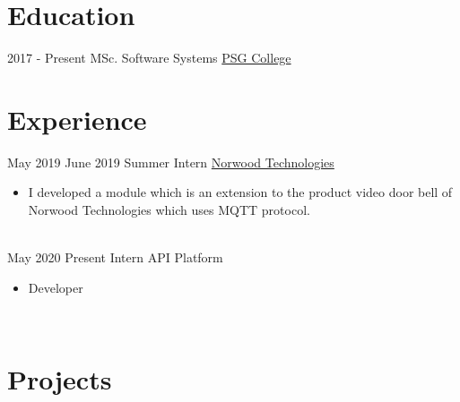 \documentclass[letterpaper]{Baseclass}
\begin{document}
\makeprofile 

\section{Education}

\begin{envvar}
	\envvaritem
    	{2017 - Present}
        {}
        {\hspace{0.2cm}MSc. Software Systems }
        {\href{http://www.psgtech.edu/}{\hspace{0.27cm}PSG College}}
        {}
        {} 
\end{envvar}


\section{Experience}

\begin{envvar}
	\envvaritem
		{May 2019}
		{June 2019}
		{\hspace{0.3cm}Summer Intern}
		{\href{https://www.linkedin.com/company/norwoodtechnologies/}{Norwood Technologies}}
		{}
		{\begin{itemize}
			\item I developed a module which is an extension to the product video door bell of Norwood Technologies which uses MQTT protocol.
		\end{itemize}}
		\\
	\envvaritem
    	{May 2020}
		{Present}
        {\hspace{0.3cm}Intern}
        {{API Platform}}
        {}
        {\begin{itemize}
        \item Developer
        \end{itemize}}
        \\           
\end{envvar}

\section{Projects}
\end{document}
